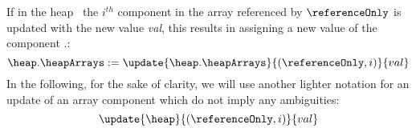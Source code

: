  If in the heap \heap \ 
 the $i^{th}$ component in the array referenced by $\referenceOnly$ is updated with the new value \textit{val},
 this results in assigning a new value of the component \heap.\heapArrays:
 $$\heap.\heapArrays := \update{\heap.\heapArrays}{(\referenceOnly , i)}{val} $$ 
 In the following, for the sake of clarity, we will use another lighter notation for an update of an array component
 which do not imply any ambiguities:
 $$ 
  \update{\heap}{(\referenceOnly , i) }{val} 
 $$ 

 
 

